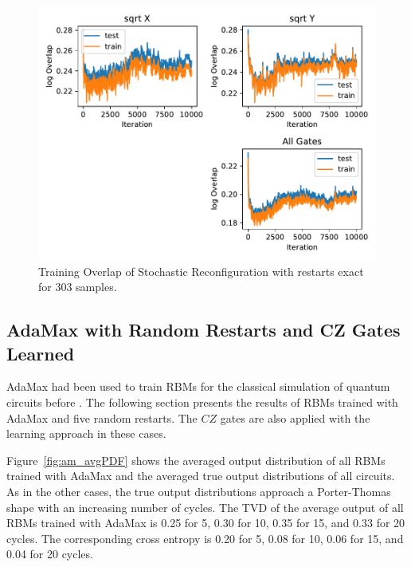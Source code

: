 \begin{figure}[H]
  \centering
  \includegraphics[width=\textwidth]{figures/results/SR-restarts-not-learned/avgOverlap_303.pdf}
  \caption[Training and Testing Overlaps for Stochastic Reconfiguration with Random Restarts and $CZ$ Gates Applied Exactly - 303 Samples]{Training 
  Overlap of Stochastic Reconfiguration with restarts exact for 303 samples.}
  \label{fig:sr_exact_overlap_303}
\end{figure}

\newpage

\subsection{AdaMax with Random Restarts and CZ Gates Learned}

AdaMax had been used to train RBMs for the 
classical simulation of quantum circuits before \cite{jnsson2018neuralnetwork}. The following section presents the results
of RBMs trained with AdaMax and five random restarts. The $CZ$ gates are also applied with the 
learning approach in these cases.

Figure~\ref{fig:am_avgPDF} shows the averaged output distribution of all RBMs trained with AdaMax and 
the averaged true output distributions of all circuits. As in the other cases, the 
true output distributions approach a Porter-Thomas shape with an increasing number of cycles.
The TVD of the average output of all RBMs trained with AdaMax
is 0.25 for 5, 0.30 for 10, 0.35 for 15, and 0.33 for 20 cycles. The corresponding cross entropy is 
0.20 for 5, 0.08 for 10, 0.06 for 15, and 0.04 for 20 cycles.

